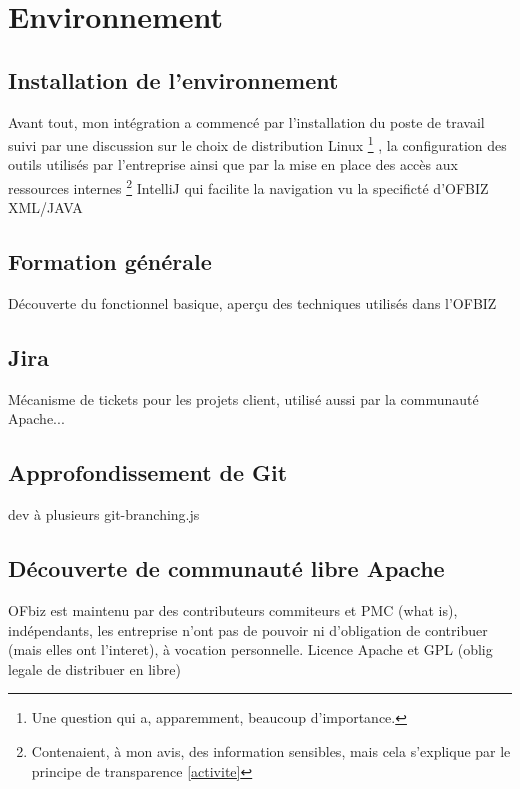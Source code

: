 \newpage









\section{Environnement}

\subsection{Installation de l'environnement}
Avant tout, mon intégration a commencé par l'installation du poste de travail suivi par une discussion sur le choix de distribution Linux \footnote{Une question qui a, apparemment, beaucoup d'importance.} , la configuration des outils utilisés par l'entreprise ainsi que par la mise en place des accès aux ressources internes \footnote{Contenaient, à mon avis, des information sensibles, mais cela s'explique par le principe de transparence \ref{activite} }
IntelliJ qui facilite la navigation vu la specificté d'OFBIZ XML/JAVA




\subsection{Formation générale}
Découverte du fonctionnel basique, aperçu des techniques utilisés dans l'OFBIZ

\subsection{Jira}
Mécanisme de tickets pour les projets client, utilisé aussi par la communauté Apache...
\subsection{Approfondissement de Git }
dev à plusieurs
git-branching.js

\subsection{Découverte de communauté libre Apache}
 OFbiz est maintenu par des contributeurs commiteurs et PMC (what is), indépendants, les entreprise n'ont pas de pouvoir ni d'obligation de contribuer (mais elles ont l'interet), à vocation personnelle. Licence Apache et GPL (oblig legale de distribuer en libre)





